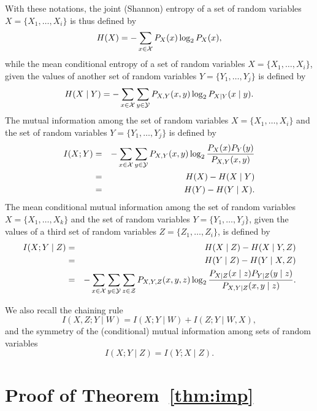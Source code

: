 \documentclass{article}
\begin{document}
With these notations, the joint (Shannon) entropy of a set of random variables $X =\{X_{1}, \ldots , X_{i}\}$ is thus defined by
\begin{equation*}
H(X)  = - \sum_{x \in {\cal X}}P_{X} (x)\log_{2}P_{X }(x),
\end{equation*}
while the mean conditional entropy of a set of random variables $X = \{X_{1}, \ldots , X_{i}\}$, given the values of another set of random variables $Y=\{Y_{1}, \ldots , Y_{j}\}$ is defined by
\begin{equation*}
H(X\mid Y) = - \sum_{x \in {\cal X}} \sum_{y \in {\cal Y}} P_{X, Y} (x, y) \log_{2} P_{X \mid Y} (x  \mid y).
 \end{equation*}
The mutual information among the set of random variables $X =\{X_{1}, \ldots , X_{i}\}$ and the set of random variables $Y=\{Y_{1}, \ldots , Y_{j}\}$ is defined by
 \begin{eqnarray*}
 I(X; Y) & = &- \sum_{x \in {\cal X}} \sum_{y \in {\cal Y}} P_{X, Y} (x, y) \log_{2} \frac{P_{X}(x) P_{Y}(y)}{P_{X,Y}(x,y)} \\
 & = & H(X) - H(X \mid Y) \\
 & = &  H(Y) - H(Y \mid X).
 \end{eqnarray*}
 The mean conditional mutual information among the set of random variables $X =\{X_{1}, \ldots , X_{k}\}$ and the set of random variables $Y=\{Y_{1}, \ldots , Y_{j}\}$, given the values of a third set of random variables $Z=\{Z_{1}, \ldots , Z_{i}\}$, is defined by
 \begin{eqnarray*}
 I(X; Y \mid Z) &= &H(X \mid Z) - H(X \mid Y, Z)\\
 & = & H(Y \mid Z) - H(Y \mid X, Z)\\
& = & - \sum_{x \in {\cal X}} \sum_{y \in {\cal Y}} \sum_{z \in {\cal Z}} P_{X, Y, Z} (x, y, z) \log_{2} \frac{P_{X \mid Z}(x \mid z) P_{Y\mid Z}(y \mid z)}{P_{X,Y \mid Z}(x,y \mid z)} .
\end{eqnarray*}

We also recall the chaining rule
\begin{equation*}
I(X, Z ; Y \mid W ) = I(X; Y \mid W  ) + I( Z ; Y \mid W, X),
\end{equation*}
and the symmetry of the (conditional) mutual information among sets of random variables
\begin{equation*}
I(X ; Y \mid Z) = I(Y ;  X  \mid Z).
\end{equation*}


\section{Proof of Theorem~\ref{thm:imp}}
\label{app:thm:imp}
\end{document}
